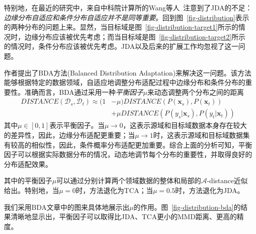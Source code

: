 特别地，在最近的研究中，来自中科院计算所的Wang等人~\cite{wang2017balanced}注意到了JDA的不足：\textit{边缘分布自适应和条件分布自适应并不是同等重要}。回到图~\ref{fig-distribution}表示的两种分布的问题上来。显然，当目标域是图~\ref{fig-distribution-target1}所示的情况时，边缘分布应该被优先考虑；而当目标域是图~\ref{fig-distribution-target2}所示的情况时，条件分布应该被优先考虑。JDA以及后来的扩展工作均忽视了这一问题。

作者提出了BDA方法(Balanced Distribution Adaptation)来解决这一问题。该方法能够根据特定的数据领域，自适应地调整分布适配过程中边缘分布和条件分布的重要性。准确而言，BDA通过采用一种\textit{平衡因子}$\mu$来动态调整两个分布之间的距离
\begin{equation}
\label{equ-mummd}
\begin{split}
DISTANCE(\mathcal{D}_s,\mathcal{D}_t) \approx  (1 &- \mu)DISTANCE(P(\mathbf{x}_s),P(\mathbf{x}_t))\\
&+ \mu DISTANCE(P(y_s|\mathbf{x}_s),P(y_t|\mathbf{x}_t))
\end{split}
\end{equation}
其中$\mu \in [0,1]$表示平衡因子。当$\mu \rightarrow 0$，这表示源域和目标域数据本身存在较大的差异性，因此，边缘分布适配更重要；当$\mu \rightarrow 1$时，这表示源域和目标域数据集有较高的相似性，因此，条件概率分布适配更加重要。综合上面的分析可知，平衡因子可以根据实际数据分布的情况，动态地调节每个分布的重要性，并取得良好的分布适配效果。

其中的平衡因子$\mu$可以通过分别计算两个领域数据的整体和局部的$\mathcal{A}$-distance近似给出。特别地，当$\mu = 0$时，方法退化为TCA；当$\mu = 0.5$时，方法退化为JDA。

我们采用BDA文章中的图来具体地展示出$\mu$的作用。图~\ref{fig-distribution-bda}的结果清晰地显示出，平衡因子可以取得比JDA、TCA更小的MMD距离、更高的精度。


\begin{figure*}[h]
	\centering

	\caption{BDA方法的效果}
	\label{fig-distribution-bda}
\end{figure*}

